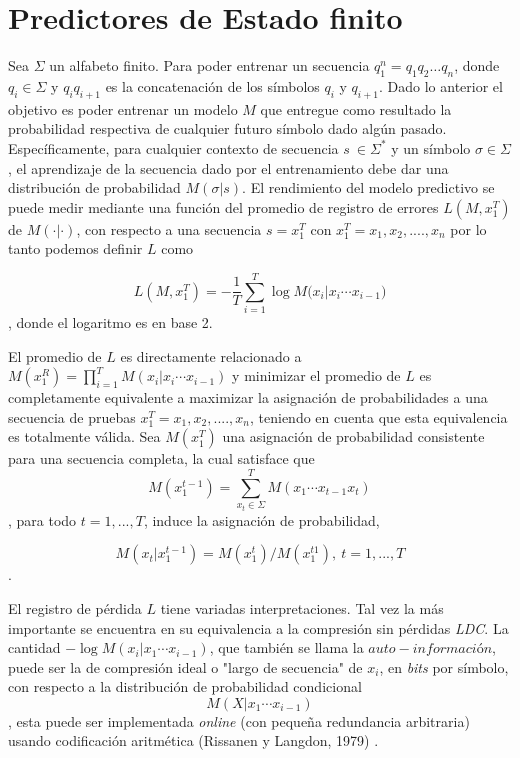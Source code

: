 \section{Predictores de Estado finito}


 

Sea $\Sigma$ un alfabeto finito. Para poder entrenar un secuencia $q_{1}^{n}=q_{1}q_{2} \dots q_{n}$, donde $q_{i} \in \Sigma$ y $q_{i}q_{i+1}$ es la concatenación de los símbolos $q_{i}$ y $q_{i+1}$. Dado lo anterior el objetivo es poder entrenar un modelo $M$ que entregue como resultado la probabilidad respectiva de cualquier futuro símbolo dado algún pasado. Específicamente, para cualquier contexto de secuencia $s \ \in \Sigma^{*} $ y un símbolo $\sigma \in \Sigma$, el aprendizaje de la secuencia dado por el entrenamiento debe dar una distribución de probabilidad $M(\sigma | s )$.
El rendimiento del modelo predictivo se puede medir mediante una función del promedio de registro de errores $L(M,x_{1}^{T})$ de $M (\cdot | \cdot )$, con respecto a una secuencia $s = x_{1}^{T}$ con $x_{1}^{T}= x_{1},x_{2},....,x_{n} $%
por lo tanto podemos definir $L$ como

\begin{equation} L( M , x_{1}^{T} ) = 
- \dfrac{1}{T} 
\sum _{i=1}^{T} \log{ M(x_{i} | x_{i} \cdots x_{i-1}} )\end{equation},
donde el logaritmo es en base 2. 

El promedio de $L$ es directamente relacionado a $M(x_{1}^{R}) = \prod_{i=1}^{T} M(x_{i} | x_{i} \cdots x_{i-1} ) $ y minimizar el promedio de $L$ es completamente equivalente a maximizar la asignación de probabilidades a una secuencia de pruebas $x_{1}^{T}= x_{1},x_{2},....,x_{n} $, teniendo en cuenta que esta equivalencia es totalmente válida. Sea $M(x_{1}^{T})$ una asignación de probabilidad consistente para una secuencia completa, la cual satisface que \begin{equation}
M(x_{1}^{t-1}) = \sum_{\mbox{$x_t$} \in \Sigma}^{T} M(x_{1} \cdots x_{t-1}x_{t} )
\end{equation}, para todo $t=1,...,T$, induce la asignación de probabilidad,

\begin{equation}
M(x_{t} | x_{1}^{t-1} ) = M(x_{1}^{t}) / M(x_{1}^{t1}),\ t=1,...,T 
\end{equation}.


El registro de pérdida $L$ tiene variadas interpretaciones. Tal vez la más importante se encuentra en su equivalencia a la compresión sin pérdidas \emph{LDC}. La cantidad $- \log M (x_{i} | x_{1} \cdots x_{i-1}) $, que también se llama la $auto-información$, puede ser la de compresión ideal o "largo de secuencia" de $x_{i}$, en \emph{bits} por símbolo, con respecto a la distribución de probabilidad condicional  \begin{equation}M (X | x_{1} \cdots x_{i-1})\end{equation}, esta puede ser implementada \emph{online} (con  pequeña redundancia arbitraria) usando codificación aritmética (Rissanen y Langdon, 1979)\cite{RissanenLangdon1979} .


